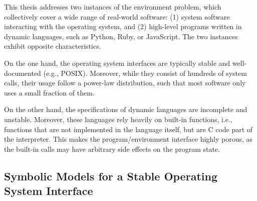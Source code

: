 
This thesis addresses two instances of the environment problem, which collectively cover a wide range of real-world software: (1) system software interacting with the operating system, and (2) high-level programs written in dynamic languages, such as Python, Ruby, or JavaScript.
%
The two instances exhibit opposite characteristics.


On the one hand, the operating system interfaces are typically stable and well-documented (e.g., POSIX).  Moreover, while they consist of hundreds of system calls, their usage follow a power-law distribution, such that most software only uses a small fraction of them.



On the other hand, the specifications of dynamic languages are incomplete and unstable.
%
Moreover, these languages rely heavily on built-in functions, i.e., functions that are not implemented in the language itself, but are C code part of the interpreter.  This makes the program/environment interface highly porous, as the built-in calls may have arbitrary side effects on the program state.

\subsection{Symbolic Models for a Stable Operating System Interface}


